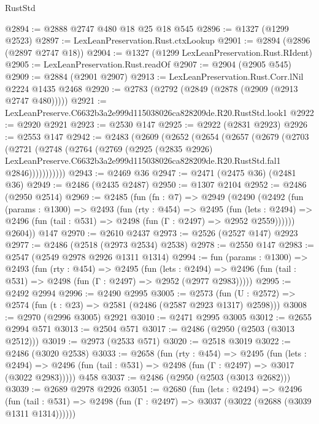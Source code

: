 \begin{lexlean}{RustStd}
\begin{coremodule}
@2894 := @2888 @2747 @480 @18 @25 @18 @545
@2896 := @1327 (@1299 @2523)
@2897 := LexLeanPreservation.Rust.ctxLookup
@2901 := @2894 (@2896 (@2897 @2747 @18))
@2904 := @1327 (@1299 LexLeanPreservation.Rust.RIdent)
@2905 := LexLeanPreservation.Rust.readOf
@2907 := @2904 (@2905 @545)
@2909 := @2884 (@2901 @2907)
@2913 := LexLeanPreservation.Rust.Corr.lNil @2224 @1435 @2468
@2920 := @2783 (@2792 (@2849 (@2878 (@2909 (@2913 @2747 @480)))))
@2921 := LexLeanPreserve.C6632b3a2e999d115038026ca828209de.R20.RustStd.look1
@2922 := @2920 @2921
@2923 := @2530 @147
@2925 := @2922 (@2831 @2923)
@2926 := @2553 @147
@2942 := @2483
    (@2609
      (@2652
        (@2654
          (@2657
            (@2679
              (@2703
                (@2721
                  (@2748
                    (@2764
                      (@2769
                        (@2925
                          (@2835 @2926)
                          LexLeanPreserve.C6632b3a2e999d115038026ca828209de.R20.RustStd.fal1
                          @2846)))))))))))
@2943 := @2469 @36
@2947 := @2471 (@2475 @36) (@2481 @36)
@2949 := @2486 (@2435 @2487)
@2950 := @1307 @2104
@2952 := @2486 (@2950 @2514)
@2969 := @2485
    (fun (fn : @7) =>
    @2949
      (@2490
        (@2492
          (fun (params : @1300) =>
          @2493
            (fun (rty : @454) =>
            @2495
              (fun (lets : @2494) =>
              @2496 (fun (tail : @531) => @2498 (fun (Γ : @2497) => @2952 @2559))))))
        @2604))
    @147
@2970 := @2610 @2437
@2973 := @2526 (@2527 @147) @2923
@2977 := @2486 (@2518 (@2973 @2534) @2538)
@2978 := @2550 @147
@2983 := @2547 (@2549 @2978 @2926 @1311 @1314)
@2994 := fun (params : @1300) =>
  @2493
    (fun (rty : @454) =>
    @2495
      (fun (lets : @2494) =>
      @2496 (fun (tail : @531) => @2498 (fun (Γ : @2497) => @2952 (@2977 @2983)))))
@2995 := @2492 @2994
@2996 := @2490 @2995
@3005 := @2573 (fun (U : @2572) => @2574 (fun (t : @23) => @2581 (@2486 (@2587 @2923 @1317) @2598)))
@3008 := @2970 (@2996 @3005) @2921
@3010 := @2471 @2995 @3005
@3012 := @2655 @2994 @571
@3013 := @2504 @571
@3017 := @2486 (@2950 (@2503 (@3013 @2512)))
@3019 := @2973 (@2533 @571)
@3020 := @2518 @3019
@3022 := @2486 (@3020 @2538)
@3033 := @2658
    (fun (rty : @454) =>
    @2495
      (fun (lets : @2494) =>
      @2496 (fun (tail : @531) => @2498 (fun (Γ : @2497) => @3017 (@3022 @2983)))))
    @458
@3037 := @2486 (@2950 (@2503 (@3013 @2682)))
@3039 := @2689 @2978 @2926
@3051 := @2680
    (fun (lets : @2494) =>
    @2496
      (fun (tail : @531) => @2498 (fun (Γ : @2497) => @3037 (@3022 (@2688 (@3039 @1311 @1314))))))

\end{coremodule}
\end{lexlean}
